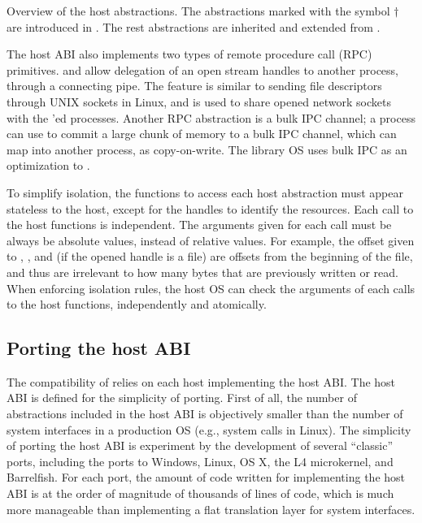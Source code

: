 \begin{table}[t!]
\centering

\caption{Overview of the \graphene{} host abstractions. The abstractions marked with the symbol $\dagger$ are introduced in \graphene{}. The rest abstractions are inherited and extended from \drawbridge{}.}
\label{tab:overview:abi}
\end{table}


The host ABI also implements two types of remote procedure call (RPC) primitives.
 and 
allow delegation of an open stream handles to another process, through a connecting pipe. The feature is similar to sending file descriptors through UNIX sockets in Linux, and is used to share opened network sockets with the 'ed processes.
Another RPC abstraction is a bulk IPC channel; a process can use  to commit a large chunk of memory to a bulk IPC channel, which  can map into another process, as copy-on-write. The library OS uses bulk IPC as an optimization to .


To simplify isolation, the functions to access each host abstraction must appear stateless to the host, except for the handles to identify the resources. Each call to the host functions is independent. The arguments given for each call must be always be absolute values, instead of relative values.
For example, the offset given to , , and  (if the opened handle is a file) are offsets from the beginning of the file, and thus are irrelevant to how many bytes that are previously written or read.
When enforcing isolation rules, the host OS can check the arguments of each calls to the host functions, independently and atomically.

\subsection{Porting the host ABI}
\label{sec:overview:host:port}


The compatibility of \graphene{} relies on each host implementing the host ABI.
The host ABI is defined for the simplicity of porting.
First of all, the number of abstractions included in the host ABI
is objectively smaller than the number of system interfaces in a production OS (e.g., system calls in Linux). 
The simplicity of porting the host ABI is experiment by the development of
several ``classic'' ports, including the ports to Windows, Linux, OS X,  the L4 microkernel, and Barrelfish.
For each port, the amount of code written for implementing the host ABI is at the order of magnitude of thousands of lines of code, which is much more manageable than implementing a flat translation layer for system interfaces.


